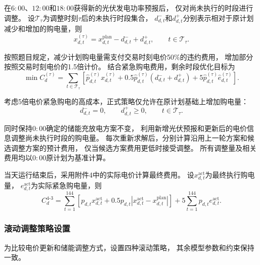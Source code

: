 在$6{:}00$、$12{:}00$和$18{:}00$获得新的光伏发电功率预报后，
仅对尚未执行的时段进行调整。
设$\mathcal{T}_{\tau}$为调整时刻$\tau$后的未执行时段集合，
$d^-_{d,t}$和$d^+_{d,t}$分别表示相对于原计划减少和增加的购电量，则
\begin{equation}
x^{(\tau)}_{d,t}
=
x^{\mathrm{plan}}_{d,t}
-d^-_{d,t}
+d^+_{d,t},
\qquad t\in\mathcal{T}_{\tau}.
\label{eq:p4_3_adjust}
\end{equation}

按照题目规定，减少计划购电量需支付交易时刻电价50\%的违约费用，
增加部分按照交易时刻电价的1.5倍计价。
结合紧急购电费用，剩余时段优化目标为
\begin{equation}
\min C_d^{(\tau)}
=
\sum_{t\in\mathcal{T}_{\tau}}
\left[
\widehat{p}^{(\tau)}_{d,t}x^{(\tau)}_{d,t}
+
0.5\widehat{p}^{(\tau)}_{d,t}
\left(d^-_{d,t}+d^+_{d,t}\right)
+
5\widehat{p}^{(\tau)}_{d,t}\widehat{e}^{(\tau)}_{d,t}
\right].
\label{eq:p4_3_adjust_cost}
\end{equation}

考虑5倍电价紧急购电的高成本，正式策略仅允许在原计划基础上增加购电量：
\begin{equation}
d^-_{d,t}=0,\qquad d^+_{d,t}\geq0,
\qquad t\in\mathcal{T}_{\tau}.
\label{eq:p4_3_no_reduction}
\end{equation}

同时保持$0{:}00$确定的储能充放电方案不变，
利用新增光伏预报和更新后的电价信息调整尚未执行时段的购电量。
每次重新求解后，分别计算沿用上一轮方案和候选调整方案的预计费用，
仅当候选方案费用更低时接受调整。
所有调整量及相关费用均以$0{:}00$原计划为基准计算。

当天运行结束后，采用附件4中的实际电价计算最终费用。
设$x^{\mathrm{act}}_{d,t}$为最终执行购电量，
$e^{\mathrm{act}}_{d,t}$为实际紧急购电量，则
\begin{equation}
C_d^{4\text{-}3}
=
\sum_{t=1}^{144}
\left[
p_{d,t}x^{\mathrm{act}}_{d,t}
+
0.5p_{d,t}
\left|
x^{\mathrm{act}}_{d,t}
-x^{\mathrm{plan}}_{d,t}
\right|
\right]
+
5\sum_{t=1}^{144}
p_{d,t}e^{\mathrm{act}}_{d,t}.
\label{eq:p4_3_actual_cost}
\end{equation}


\subsubsection{滚动调整策略设置}

为比较电价更新和储能调整方式，设置四种滚动策略，
其余模型参数和约束保持一致。

